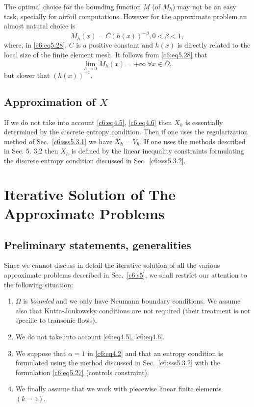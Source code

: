 \begin{remark}\label{c6:rem5.9}%
The optimal choice for the bounding function $M$ (of $M_h$) may not be 
an easy task, specially for airfoil computations. However for the 
approximate problem an almost natural choice is    
\begin{equation}
M_h (x) = C(h(x))^{-\beta}, 0 < \beta < 1, \tag{5.28}\label{c6:eq5.28} 
\end{equation}
where, in \eqref{c6:eq5.28}, $C$ is a positive constant and $h(x)$ is 
directly related to the local size of the finite element mesh. It 
follows from \eqref{c6:eq5.28} that   
$$
\lim_{h \to 0} M_h (x) = + \infty ~ \forall x \in \overline{\Omega},
$$\pageoriginale 
but slower that $(h(x))^{-1}$.
\end{remark}

\subsection{Approximation of $X$}\label{c6:ss5.4}%

If we do not take into account \eqref{c6:eq4.5}, \eqref{c6:eq4.6} then 
$X_h$ is essentially determined by the discrete entropy condition. 
Then if one uses the regularization method of Sec.~\ref{c6:sss5.3.1} we 
have $X_h  = V_h$. If one uses the methods described in Sec. 5. 3.2 
then $X_h$ is  defined by the linear inequality constraints formulating 
the discrete  entropy condition  discussed in Sec.~\ref{c6:sss5.3.2}.      

\section{Iterative Solution of The Approximate Problems}\label{c6:s6}%
 
\subsection{Preliminary statements, generalities}\label{c6:ss6.1}%
 
 Since we cannot discuss in detail the iterative solution of all the 
 various approximate problems described in Sec.~\ref{c6:s5}, we shall 
 restrict  our attention to the following situation:  
\begin{enumerate}[-]
\item $\Omega$ is \textit{bounded} and we only have Neumann boundary 
conditions. We assume also that Kutta-Joukowsky conditions are not 
required (their treatment is not specific to transonic flows).  
\item We do not take into account \eqref{c6:eq4.5}, \eqref{c6:eq4.6}. 
\item We suppose that $\alpha = 1$ in \eqref{c6:eq4.2} and that an 
entropy condition is formulated using the method discussed in 
Sec.~\ref{c6:sss5.3.2} with the formulation \eqref{c6:eq5.27} 
(controls constraint).   
\item We finally assume that we work with piecewise linear finite 
elements $(k = 1)$. 
\end{enumerate} 
 
